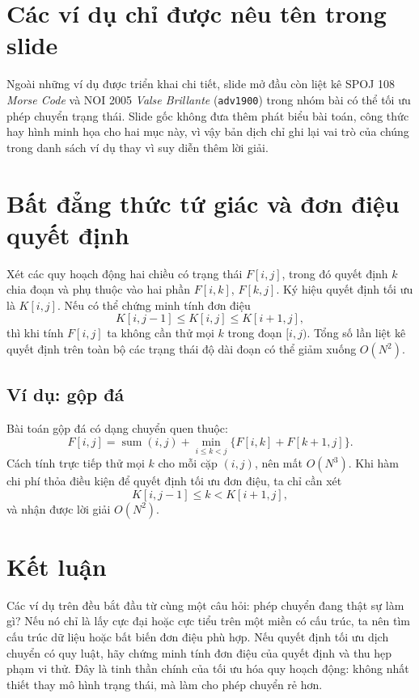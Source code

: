 \documentclass[11pt]{article}
\begin{document}
\section{Các ví dụ chỉ được nêu tên trong slide}

Ngoài những ví dụ được triển khai chi tiết, slide mở đầu còn liệt kê SPOJ 108
\emph{Morse Code} và NOI 2005 \emph{Valse Brillante} (\texttt{adv1900}) trong
nhóm bài có thể tối ưu phép chuyển trạng thái. Slide gốc không đưa thêm phát
biểu bài toán, công thức hay hình minh họa cho hai mục này, vì vậy bản dịch
chỉ ghi lại vai trò của chúng trong danh sách ví dụ thay vì suy diễn thêm lời
giải.

\section{Bất đẳng thức tứ giác và đơn điệu quyết định}

Xét các quy hoạch động hai chiều có trạng thái $F[i,j]$, trong đó quyết định
$k$ chia đoạn và phụ thuộc vào hai phần $F[i,k]$, $F[k,j]$. Ký hiệu quyết định
tối ưu là $K[i,j]$. Nếu có thể chứng minh tính đơn điệu
\[
  K[i,j-1]\le K[i,j]\le K[i+1,j],
\]
thì khi tính $F[i,j]$ ta không cần thử mọi $k$ trong đoạn $[i,j)$. Tổng số lần
liệt kê quyết định trên toàn bộ các trạng thái độ dài đoạn có thể giảm xuống
$O(N^2)$.

\subsection*{Ví dụ: gộp đá}

Bài toán gộp đá có dạng chuyển quen thuộc:
\[
  F[i,j]=\operatorname{sum}(i,j)+
  \min_{i\le k<j}\{F[i,k]+F[k+1,j]\}.
\]
Cách tính trực tiếp thử mọi $k$ cho mỗi cặp $(i,j)$, nên mất $O(N^3)$. Khi
hàm chi phí thỏa điều kiện để quyết định tối ưu đơn điệu, ta chỉ cần xét
\[
  K[i,j-1]\le k < K[i+1,j],
\]
và nhận được lời giải $O(N^2)$.

\section*{Kết luận}

Các ví dụ trên đều bắt đầu từ cùng một câu hỏi: phép chuyển đang thật sự làm
gì? Nếu nó chỉ là lấy cực đại hoặc cực tiểu trên một miền có cấu trúc, ta nên
tìm cấu trúc dữ liệu hoặc bất biến đơn điệu phù hợp. Nếu quyết định tối ưu
dịch chuyển có quy luật, hãy chứng minh tính đơn điệu của quyết định và thu
hẹp phạm vi thử. Đây là tinh thần chính của tối ưu hóa quy hoạch động: không
nhất thiết thay mô hình trạng thái, mà làm cho phép chuyển rẻ hơn.
\end{document}
